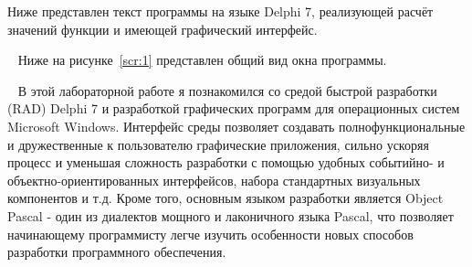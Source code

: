 \clearpage
{}
Ниже представлен текст программы на языке Delphi 7, реализующей расчёт значений функции и имеющей графический интерфейс.
\clearpage

\ 
Ниже на рисунке~\ref{scr:1} представлен общий вид окна программы.
\suppressfloats[t]
{}

\ 
В этой лабораторной работе я познакомился со средой быстрой разработки (RAD) Delphi 7 и разработкой графических программ для операционных систем Microsoft Windows. Интерфейс среды позволяет создавать полнофункциональные и дружественные к пользователю графические приложения, сильно ускоряя процесс и уменьшая сложность разработки с помощью удобных событийно- и объектно-ориентированных интерфейсов, набора стандартных визуальных компонентов и т.д. Кроме того, основным языком разработки является Object Pascal - один из диалектов мощного и лаконичного языка Pascal, что позволяет начинающему программисту легче изучить особенности новых способов разработки программного обеспечения. 

